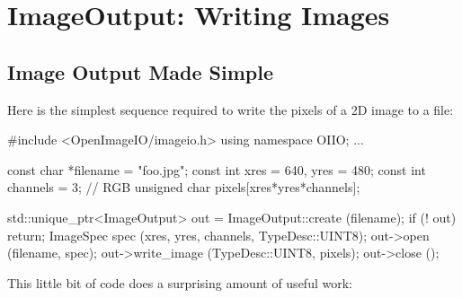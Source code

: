 \chapter{ImageOutput: Writing Images}
\label{chap:imageoutput}


\section{Image Output Made Simple}
\label{sec:imageoutput:simple}

Here is the simplest sequence required to write the pixels of a 2D image
to a file:

\begin{code}
        #include <OpenImageIO/imageio.h>
        using namespace OIIO;
        ...

        const char *filename = "foo.jpg";
        const int xres = 640, yres = 480;
        const int channels = 3;  // RGB
        unsigned char pixels[xres*yres*channels];

        std::unique_ptr<ImageOutput> out = ImageOutput::create (filename);
        if (! out)
            return;
        ImageSpec spec (xres, yres, channels, TypeDesc::UINT8);
        out->open (filename, spec);
        out->write_image (TypeDesc::UINT8, pixels);
        out->close ();
\end{code}

\noindent This little bit of code does a surprising amount of useful work:  

